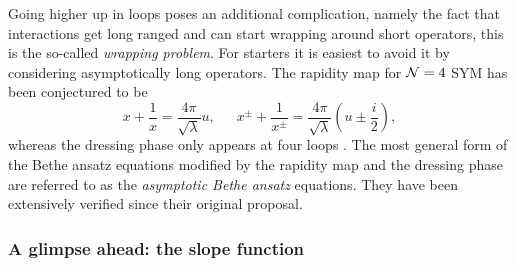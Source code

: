 Going higher up in loops poses an additional complication, namely the fact that interactions get long ranged and can start wrapping around short operators, this is the so-called \emph{wrapping problem}.
For starters it is easiest to avoid it by considering asymptotically long operators. 
The rapidity map for $\mathcal{N}=4$ SYM has been conjectured to be \cite{Beisert:2004hm}
\begin{equation}
	\label{eq:xox_rapidity}
	x + \frac{1}{x} = \frac{4 \pi}{\sqrt{\lambda}} u, \,\,\,\,\,\,\,\,\, x^{\pm} + \frac{1}{x^{\pm}} = \frac{4 \pi}{\sqrt{\lambda}} \left( u \pm \frac{i}{2} \right),
\end{equation}
whereas the dressing phase only appears at four loops \cite{Beisert:2006ez}. 
The most general form of the Bethe ansatz equations  modified by the rapidity map and the dressing phase are referred to as the \emph{asymptotic Bethe ansatz} equations.
They have been extensively verified \cite{Arutyunov:2003rg,Giombi:2010zi} since their original proposal.


\subsubsection{A glimpse ahead: the slope function}
\label{sec:slope_function_aba}

